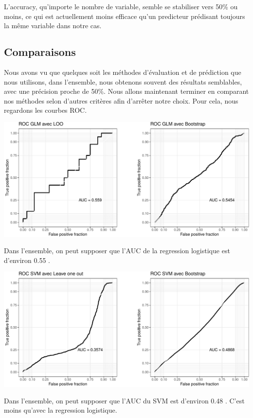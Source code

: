 \documentclass[]{article}
\begin{document}
L'accuracy, qu'importe le nombre de variable, semble se stabiliser vers
50\% ou moins, ce qui est actuellement moins efficace qu'un predicteur
prédisant toujours la même variable dans notre cas.

\hypertarget{comparaisons}{%
\subsection{Comparaisons}\label{comparaisons}}

Nous avons vu que quelques soit les méthodes d'évaluation et de
prédiction que nous utilisons, dans l'ensemble, nous obtenons souvent
des résultats semblables, avec une précision proche de 50\%. Nous allons
maintenant terminer en comparant nos méthodes selon d'autres critères
afin d'arrêter notre choix. Pour cela, nous regardons les courbes ROC.

\includegraphics{repport_projet_files/figure-latex/unnamed-chunk-57-1.pdf}

Dans l'ensemble, on peut supposer que l'AUC de la regression logistique
est d'environ 0.55 .

\includegraphics{repport_projet_files/figure-latex/unnamed-chunk-58-1.pdf}

Dans l'ensemble, on peut supposer que l'AUC du SVM est d'environ 0.48 .
C'est moins qu'avec la regression logistique.
\end{document}
